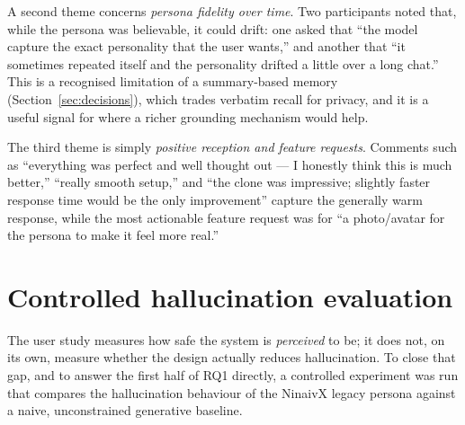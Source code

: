 \documentclass[11pt,a4paper]{report}
\begin{document}
A second theme concerns \emph{persona fidelity over time}. Two participants noted that, while the persona was believable, it could drift: one asked that ``the model capture the exact personality that the user wants,'' and another that ``it sometimes repeated itself and the personality drifted a little over a long chat.'' This is a recognised limitation of a summary-based memory (Section~\ref{sec:decisions}), which trades verbatim recall for privacy, and it is a useful signal for where a richer grounding mechanism would help.

The third theme is simply \emph{positive reception and feature requests}. Comments such as ``everything was perfect and well thought out --- I honestly think this is much better,'' ``really smooth setup,'' and ``the clone was impressive; slightly faster response time would be the only improvement'' capture the generally warm response, while the most actionable feature request was for ``a photo/avatar for the persona to make it feel more real.''

\section{Controlled hallucination evaluation}
\label{sec:fab-eval}
The user study measures how safe the system is \emph{perceived} to be; it does not, on its own, measure whether the design actually reduces hallucination. To close that gap, and to answer the first half of RQ1 directly, a controlled experiment was run that compares the hallucination behaviour of the NinaivX legacy persona against a naive, unconstrained generative baseline.
\end{document}
